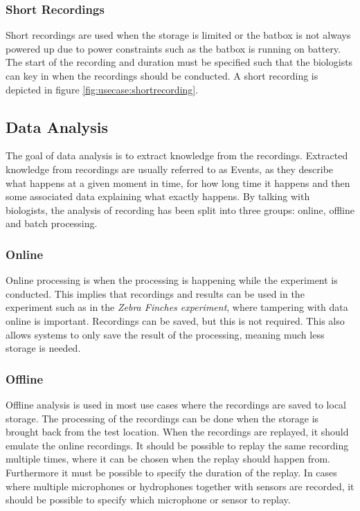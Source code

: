 \subsubsection{Short Recordings}\label{sec:usecase:shortrecording}
Short recordings are used when the storage is limited or the batbox is not always powered up due to power constraints such as the batbox is running on battery. The start of the recording and duration must be specified such that the biologists can key in when the recordings should be conducted.
A short recording is depicted in figure \ref{fig:usecase:shortrecording}.


\subsection{Data Analysis} \label{sec:dataanalysis}
The goal of data analysis is to extract knowledge from the recordings. Extracted knowledge from recordings are usually referred to as Events, as they describe what happens at a given moment in time, for how long time it happens and then some associated data explaining what exactly happens.
By talking with biologists, the analysis of recording has been split into three groups: online, offline and batch processing. 

\subsubsection{Online}\label{sec:usecase:online}
Online processing is when the processing is happening while the experiment is conducted. This implies that recordings and results can be used in the experiment such as in the \textit{Zebra Finches experiment}, where tampering with data online is important. Recordings can be saved, but this is not required. This also allows systems to only save the result of the processing, meaning much less storage is needed.

\subsubsection{Offline}
Offline analysis is used in most use cases where the recordings are saved to local storage. The processing of the recordings can be done when the storage is brought back from the test location. When the recordings are replayed, it should emulate the online recordings.
It should be possible to replay the same recording multiple times, where it can be chosen when the replay should happen from. Furthermore it must be possible to specify the duration of the replay. In cases where multiple microphones or hydrophones together with sensors are recorded, it should be possible to specify which microphone or sensor to replay.

